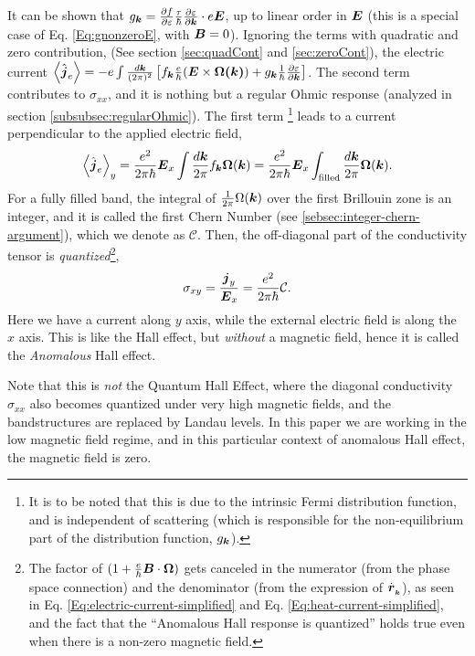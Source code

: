\documentclass{report}
\renewcommand\vec[1]{\ensuremath\boldsymbol{#1}} %
\begin{document}
It can be shown that  $g_{\vec{k}} = \frac{\partial f} {\partial \varepsilon}
\frac{\tau}{\hbar} \frac{\partial \varepsilon}{\partial \vec{k}}\cdot e \vec{E}$, up to linear order in $\vec{E}$ (this is a special case of Eq. \eqref{Eq:gnonzeroE}, with $\vec{B} = 0$). Ignoring the terms with quadratic and zero contribution, (See section \ref{sec:quadCont} and \ref{sec:zeroCont}), the electric current $\expval{\hat{\vec{j}}_e} = -e \int \frac{d\vec{k}}{(2\pi)^2} \left[{f}_{\vec{k}} \frac{e}{\hbar} (\vec{E}\times\vec{\Omega(\vec{k})}) + {g}_{\vec{k}} \frac{1}{\hbar} \frac{\partial \varepsilon}{\partial \vec{k}}\right] $. The second term contributes to $\sigma_{xx}$, and it is nothing but a regular Ohmic response (analyzed in section \ref{subsubsec:regularOhmic}). The first term \footnote{It is to be noted that this is due to the intrinsic Fermi distribution function, and is independent of scattering (which is responsible for the non-equilibrium part of the distribution function, ${g}_{\vec{k}}$).} leads to a current perpendicular to the applied electric field,
$$\expval{\hat{\vec{j}}_e}_y = \frac{e^2}{2 \pi \hbar} \vec{E}_x \int \frac{d\vec{k}}{2\pi} {f}_{\vec{k}} \vec{\Omega}(\vec{k}) = \frac{e^2}{2 \pi \hbar} \vec{E}_x \int_{\text{filled}} \frac{d\vec{k}}{2\pi} \vec{\Omega}(\vec{k}).$$
For a fully filled band, the integral of $\frac{1}{2\pi}\Omega(\vec{k})$ over the first Brillouin zone is an integer, and it is called the first Chern Number (see \ref{sebsec:integer-chern-argument}), which we denote as $\mathcal{C}$. Then, the off-diagonal part of the conductivity tensor is \textit{quantized}\footnote{The factor of $(1 + \frac{e}{\hbar} \vec{B}\cdot\vec{\Omega})$ gets canceled in the numerator (from the phase space connection) and the denominator (from the expression of $\dot{\vec{r}}_{_{\vec{k}}}$), as seen in Eq. \eqref{Eq:electric-current-simplified} and Eq. \eqref{Eq:heat-current-simplified}, and the fact that the ``Anomalous Hall response is quantized'' holds true even when there is a non-zero magnetic field.},
$$\sigma_{xy} = \frac{\vec{j}_y}{\vec{E}_x} = \frac{e^2}{2\pi \hbar} \mathcal{C}.$$
Here we have a current along $y$ axis, while the external electric field is along the $x$ axis. This is like the Hall effect, but \textit{without} a magnetic field, hence it is called the \textit{Anomalous} Hall effect.

Note that this is \textit{not} the Quantum Hall Effect, where the diagonal conductivity $\sigma_{xx}$ also becomes quantized under very high magnetic fields, and the bandstructures are replaced by Landau levels. In this paper we are working in the low magnetic field regime, and in this particular context of anomalous Hall effect, the magnetic field is zero.
 
\end{document}
